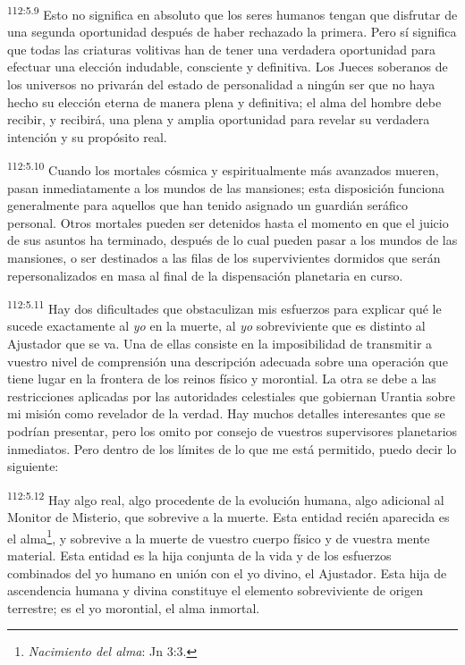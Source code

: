 \documentclass[twoside, 11pt]{book}
\begin{document}
\par
\textsuperscript{112:5.9} Esto no significa en absoluto que los seres humanos tengan que disfrutar de una segunda oportunidad después de haber rechazado la primera. Pero sí significa que todas las criaturas volitivas han de tener una verdadera oportunidad para efectuar una elección indudable, consciente y definitiva. Los Jueces soberanos de los universos no privarán del estado de personalidad a ningún ser que no haya hecho su elección eterna de manera plena y definitiva; el alma del hombre debe recibir, y recibirá, una plena y amplia oportunidad para revelar su verdadera intención y su propósito real.

\par
\textsuperscript{112:5.10} Cuando los mortales cósmica y espiritualmente más avanzados mueren, pasan inmediatamente a los mundos de las mansiones; esta disposición funciona generalmente para aquellos que han tenido asignado un guardián seráfico personal. Otros mortales pueden ser detenidos hasta el momento en que el juicio de sus asuntos ha terminado, después de lo cual pueden pasar a los mundos de las mansiones, o ser destinados a las filas de los supervivientes dormidos que serán repersonalizados en masa al final de la dispensación planetaria en curso.

\par
\textsuperscript{112:5.11} Hay dos dificultades que obstaculizan mis esfuerzos para explicar qué le sucede exactamente al \textit{yo} en la muerte, al \textit{yo} sobreviviente que es distinto al Ajustador que se va. Una de ellas consiste en la imposibilidad de transmitir a vuestro nivel de comprensión una descripción adecuada sobre una operación que tiene lugar en la frontera de los reinos físico y morontial. La otra se debe a las restricciones aplicadas por las autoridades celestiales que gobiernan Urantia sobre mi misión como revelador de la verdad. Hay muchos detalles interesantes que se podrían presentar, pero los omito por consejo de vuestros supervisores planetarios inmediatos. Pero dentro de los límites de lo que me está permitido, puedo decir lo siguiente:

\par
\textsuperscript{112:5.12} Hay algo real, algo procedente de la evolución humana, algo adicional al Monitor de Misterio, que sobrevive a la muerte. Esta entidad recién aparecida es el alma\footnote{\textit{Nacimiento del alma}: Jn 3:3.}, y sobrevive a la muerte de vuestro cuerpo físico y de vuestra mente material. Esta entidad es la hija conjunta de la vida y de los esfuerzos combinados del yo humano en unión con el yo divino, el Ajustador. Esta hija de ascendencia humana y divina constituye el elemento sobreviviente de origen terrestre; es el yo morontial, el alma inmortal.
\end{document}
